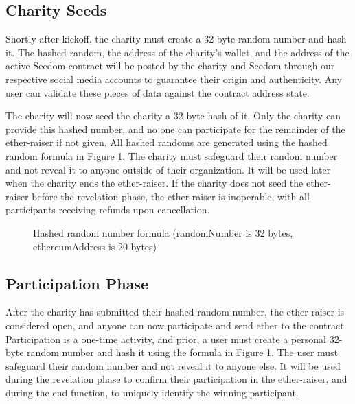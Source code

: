 \documentclass[11pt]{article}
\begin{document}
\subsection{Charity Seeds}
Shortly after kickoff, the charity must create a 32-byte random number and hash it. The hashed random, the address of the charity's wallet, and the address of the active Seedom contract will be posted by the charity and Seedom through our respective social media accounts to guarantee their origin and authenticity. Any user can validate these pieces of data against the contract address state.

The charity will now seed the charity a 32-byte hash of it. Only the charity can provide this hashed number, and no one can participate for the remainder of the ether-raiser if not given. All hashed randoms are generated using the hashed random formula in Figure \ref{figure:hashedRandomNumberFormula}. The charity must safeguard their random number and not reveal it to anyone outside of their organization. It will be used later when the charity ends the ether-raiser. If the charity does not seed the ether-raiser before the revelation phase, the ether-raiser is inoperable, with all participants receiving refunds upon cancellation.

\begin{figure}[H]
\begin{center}
\caption{Hashed random number formula (randomNumber is 32 bytes, ethereumAddress is 20 bytes)}
\label{figure:hashedRandomNumberFormula}
\end{center}
\end{figure}

\subsection{Participation Phase}

After the charity has submitted their hashed random number, the ether-raiser is considered open, and anyone can now participate and send ether to the contract. Participation is a one-time activity, and prior, a user must create a personal 32-byte random number and hash it using the formula in Figure \ref{figure:hashedRandomNumberFormula}. The user must safeguard their random number and not reveal it to anyone else. It will be used during the revelation phase to confirm their participation in the ether-raiser, and during the end function, to uniquely identify the winning participant.
\end{document}
